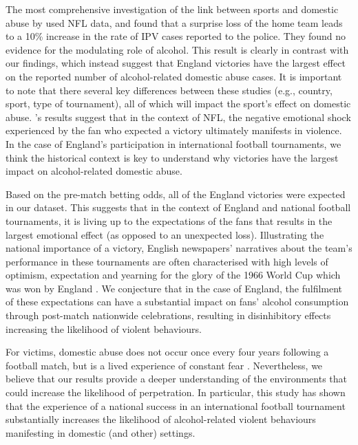 \documentclass[12pt, a4paper]{article}
\begin{document}
The most comprehensive investigation of the link between sports and domestic abuse by  used NFL data, and found that a surprise loss of the home team leads to a 10\% increase in the rate of IPV cases reported to the police. They found no evidence for the modulating role of alcohol. This result is clearly in contrast with our findings, which instead suggest that England victories have the largest effect on the reported number of alcohol-related domestic abuse cases.
It is important to note that there several key differences between these studies (e.g., country, sport, type of tournament), all of which will impact the sport's effect on domestic abuse. \citeauthor{Card2011}'s results suggest that in the context of NFL, the negative emotional shock experienced by the fan who expected a victory ultimately manifests in violence. In the case of England's participation in international football tournaments, we think the historical context is key to understand why victories have the largest impact on alcohol-related domestic abuse.


Based on the pre-match betting odds, all of the England victories were expected in our dataset. This suggests that in the context of England and national football tournaments, it is living up to the expectations of the fans that results in the largest emotional effect (as opposed to an unexpected loss). Illustrating the national importance of a victory, English newspapers' narratives about the team's performance in these tournaments are often characterised with high levels of optimism, expectation and yearning for the glory of the 1966 World Cup which was won by England \cite{Vincent2010}. We conjecture that in the case of England, the fulfilment of these expectations can have a substantial impact on fans' alcohol consumption through post-match nationwide celebrations, resulting in disinhibitory effects increasing the likelihood of violent behaviours.




For victims, domestic abuse does not occur once every four years following a football match, but is a lived experience of constant fear \cite{Brooks-Hay2018}. Nevertheless, we believe that our results provide a deeper understanding of the environments that could increase the likelihood of perpetration. In particular, this study has shown that the experience of a national success in an international football tournament substantially increases the likelihood of alcohol-related violent behaviours manifesting in domestic (and other) settings.
\end{document}

